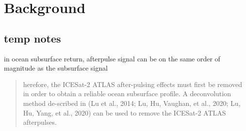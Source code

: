 \chapter{Background}



\section{temp notes}
in ocean subsurface return, afterpulse signal can be on the same order of magnitude as the subsurface signal \cite{}

\begin{quote}
    herefore, the ICESat-2 ATLAS after-pulsing effects must first be removed in order to obtain a reliable ocean subsurface profile. A deconvolution method de-scribed in (Lu et al., 2014; Lu, Hu, Vaughan, et al., 2020; Lu, Hu, Yang, et al., 2020) can be used to remove the ICESat-2 ATLAS afterpulses. \citeauthor{Lu2021a}
\end{quote}